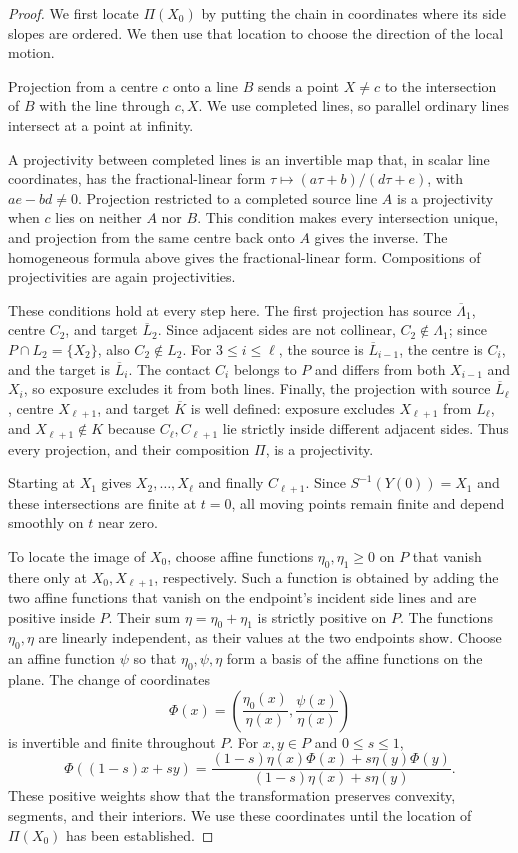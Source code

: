 \documentclass[11pt,a4paper]{article}
\theoremstyle{definition}
\theoremstyle{remark}
\numberwithin{equation}{section}
\begin{document}
\begin{proof}
We first locate $\Pi(X_0)$ by putting the chain in coordinates where its side slopes are ordered. We then use that location to choose the direction of the local motion.

Projection from a centre $c$ onto a line $B$ sends a point $X\ne c$ to the intersection of $B$ with the line through $c,X$. We use completed lines, so parallel ordinary lines intersect at a point at infinity.

A projectivity between completed lines is an invertible map that, in scalar line coordinates, has the fractional-linear form $\tau\mapsto(a\tau+b)/(d\tau+e)$, with $ae-bd\ne0$. Projection restricted to a completed source line $A$ is a projectivity when $c$ lies on neither $A$ nor $B$. This condition makes every intersection unique, and projection from the same centre back onto $A$ gives the inverse. The homogeneous formula above gives the fractional-linear form. Compositions of projectivities are again projectivities.

These conditions hold at every step here. The first projection has source $\overline\Lambda_1$, centre $C_2$, and target $\overline L_2$. Since adjacent sides are not collinear, $C_2\notin\Lambda_1$; since $P\cap L_2=\{X_2\}$, also $C_2\notin L_2$. For $3\le i\le\ell$, the source is $\overline L_{i-1}$, the centre is $C_i$, and the target is $\overline L_i$. The contact $C_i$ belongs to $P$ and differs from both $X_{i-1}$ and $X_i$, so exposure excludes it from both lines. Finally, the projection with source $\overline L_\ell$, centre $X_{\ell+1}$, and target $\overline K$ is well defined: exposure excludes $X_{\ell+1}$ from $L_\ell$, and $X_{\ell+1}\notin K$ because $C_\ell,C_{\ell+1}$ lie strictly inside different adjacent sides. Thus every projection, and their composition $\Pi$, is a projectivity.

Starting at $X_1$ gives $X_2,\ldots,X_\ell$ and finally $C_{\ell+1}$. Since $S^{-1}(Y(0))=X_1$ and these intersections are finite at $t=0$, all moving points remain finite and depend smoothly on $t$ near zero.

To locate the image of $X_0$, choose affine functions $\eta_0,\eta_1\ge0$ on $P$ that vanish there only at $X_0,X_{\ell+1}$, respectively. Such a function is obtained by adding the two affine functions that vanish on the endpoint's incident side lines and are positive inside $P$. Their sum $\eta=\eta_0+\eta_1$ is strictly positive on $P$. The functions $\eta_0,\eta$ are linearly independent, as their values at the two endpoints show. Choose an affine function $\psi$ so that $\eta_0,\psi,\eta$ form a basis of the affine functions on the plane. The change of coordinates
\[
 \Phi(x)=\left(\frac{\eta_0(x)}{\eta(x)},
                  \frac{\psi(x)}{\eta(x)}\right)
\]
is invertible and finite throughout $P$. For $x,y\in P$ and $0\le s\le1$,
\[
 \Phi((1-s)x+sy)=
 \frac{(1-s)\eta(x)\Phi(x)+s\eta(y)\Phi(y)}
 {(1-s)\eta(x)+s\eta(y)}.
\]
These positive weights show that the transformation preserves convexity, segments, and their interiors. We use these coordinates until the location of $\Pi(X_0)$ has been established.


\end{proof}
\end{document}
